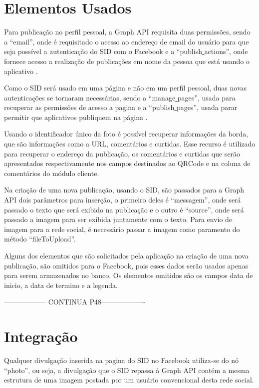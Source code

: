 \section{Elementos Usados}
Para publicação no perfil pessoal, a Graph API requisita duas permissões, sendo a “email”, onde é requisitado o acesso ao endereço de email do usuário para que seja possível a autenticação do SID com o Facebook e a “publish\underline{{ }}actions”, onde fornece acesso a realização de publicações em nome da pessoa que está usando o aplicativo \cite{facebook2018a}.

Como o SID será usado em uma página e não em um perfil pessoal, duas novas autenticações se tornaram necessárias, sendo a “manage\underline{{ }}pages”, usada para recuperar as permissões de acesso a pagina e a “publish\underline{{ }}pages”, usada parar permitir que aplicativos publiquem na página \cite{facebook2018a}.

Usando o identificador único da foto é possível recuperar informações da borda, que são informações como a URL, comentários e curtidas. Esse recurso é utilizado para recuperar o endereço da publicação, os comentários e curtidas que serão apresentados respectivamente nos campos destinados ao QRCode e na coluna de comentários do módulo cliente.

Na criação de uma nova publicação, usando o SID, são passados para a Graph API dois parâmetros para inserção, o primeiro deles é “messagem”, onde será passado o texto que será exibido na publicação e o outro é “source”, onde será passado a imagem para ser exibida juntamente com o texto. Para envio de imagem para a rede social, é necessário passar a imagem como paramento do método “fileToUpload”. 

Alguns dos elementos que são solicitados pela aplicação na criação de uma nova publicação, são omitidos para o Facebook, pois esses dados serão usados apenas para serem armazenados no banco. Os elementos omitidos são os campos data de inicio, a data de termino e a legenda. 

------------------ CONTINUA  P48-------------------

\section{Integração}
Qualquer divulgação inserida na pagina do SID no Facebook utiliza-se do nó “photo”, ou seja, a divulgação que o SID repassa à Graph API contém a mesma estrutura de uma imagem postada por um usuário convencional desta rede social. 

